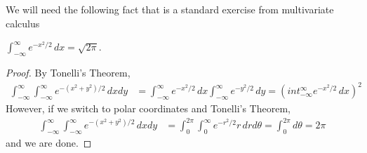 We will need the following fact that is a standard exercise from multivariate calculus
\begin{lem}\label{IntegralGaussian}$\int_{-\infty}^\infty e^{-x^2/2}\, dx = \sqrt{2\pi}$.
\end{lem}
\begin{proof}
By Tonelli's Theorem,
\begin{align*}
\int_{-\infty}^\infty \int_{-\infty}^\infty e^{-(x^2 + y^2)/2} \, dxdy
&= \int_{-\infty}^\infty e^{-x^2/2} \,
dx \int_{-\infty}^\infty e^{-y^2/2} \,
dy = \left(int_{-\infty}^\infty e^{-x^2/2} \,
dx \right)^2
\end{align*}
However, if we switch to polar coordinates and Tonelli's Theorem,
\begin{align*}
\int_{-\infty}^\infty \int_{-\infty}^\infty e^{-(x^2 + y^2)/2} \, dxdy
&= \int_{0}^{2\pi} \int_{0}^\infty e^{-r^2/2} r \, dr d\theta =
\int_{0}^{2\pi} d\theta = 2\pi
\end{align*}
and we are done.
\end{proof}

